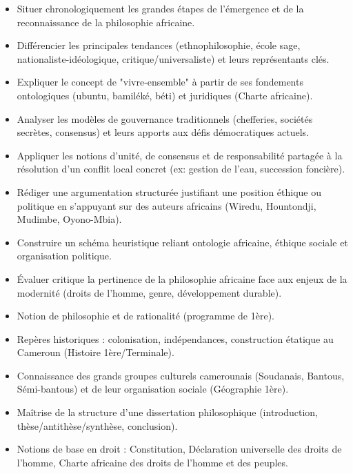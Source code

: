 \documentclass[11pt]{article}
\begin{document}
\begin{objectifs}
\begin{itemize}
\item Situer chronologiquement les grandes étapes de l'émergence et de la reconnaissance de la philosophie africaine.
\item Différencier les principales tendances (ethnophilosophie, école sage, nationaliste-idéologique, critique/universaliste) et leurs représentants clés.
\item Expliquer le concept de "vivre-ensemble" à partir de ses fondements ontologiques (ubuntu, bamiléké, béti) et juridiques (Charte africaine).
\item Analyser les modèles de gouvernance traditionnels (chefferies, sociétés secrètes, consensus) et leurs apports aux défis démocratiques actuels.
\item Appliquer les notions d'unité, de consensus et de responsabilité partagée à la résolution d'un conflit local concret (ex: gestion de l'eau, succession foncière).
\item Rédiger une argumentation structurée justifiant une position éthique ou politique en s'appuyant sur des auteurs africains (Wiredu, Hountondji, Mudimbe, Oyono-Mbia).
\item Construire un schéma heuristique reliant ontologie africaine, éthique sociale et organisation politique.
\item Évaluer critique la pertinence de la philosophie africaine face aux enjeux de la modernité (droits de l'homme, genre, développement durable).
\end{itemize}
\end{objectifs}

\begin{prerequis}
\begin{itemize}
\item Notion de philosophie et de rationalité (programme de 1ère).
\item Repères historiques : colonisation, indépendances, construction étatique au Cameroun (Histoire 1ère/Terminale).
\item Connaissance des grands groupes culturels camerounais (Soudanais, Bantous, Sémi-bantous) et de leur organisation sociale (Géographie 1ère).
\item Maîtrise de la structure d'une dissertation philosophique (introduction, thèse/antithèse/synthèse, conclusion).
\item Notions de base en droit : Constitution, Déclaration universelle des droits de l'homme, Charte africaine des droits de l'homme et des peuples.
\end{itemize}
\end{prerequis}
\end{document}
